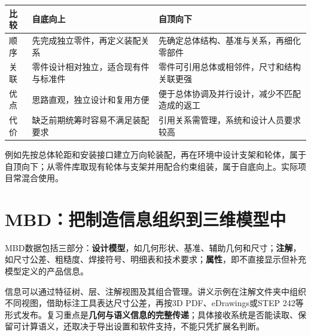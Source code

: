 \begin{center}
\renewcommand{\arraystretch}{1.3}
\begin{tabularx}{\linewidth}{lXX}
\toprule
比较 & 自底向上 & 自顶向下 \\
\midrule
顺序 & 先完成独立零件，再定义装配关系 & 先确定总体结构、基准与关系，再细化零部件 \\
关联 & 零件设计相对独立，适合现有件与标准件 & 零件可引用总体或相邻件，尺寸和结构关联更强 \\
优点 & 思路直观，独立设计和复用方便 & 便于总体协调及并行设计，减少不匹配造成的返工 \\
代价 & 缺乏前期统筹时容易不满足装配要求 & 引用关系需管理，系统和设计人员要求较高 \\
\bottomrule
\end{tabularx}
\end{center}

例如先按总体轮距和安装接口建立万向轮装配，再在环境中设计支架和轮体，属于自顶向下；从零件库取现有轮体与支架并用配合约束组装，属于自底向上。实际项目常混合使用。

\section{MBD：把制造信息组织到三维模型中}

MBD数据包括三部分：\textbf{设计模型}，如几何形状、基准、辅助几何和尺寸；\textbf{注解}，如尺寸公差、粗糙度、焊接符号、明细表和技术要求；\textbf{属性}，即不直接显示但补充模型定义的产品信息。

信息可以通过特征树、层、注解视图及其组合管理。讲义示例在注解文件夹中组织不同视图，借助标注工具表达尺寸公差，再按3D PDF、eDrawings或STEP 242等形式发布。复习重点是\textbf{几何与语义信息的完整传递}；具体接收系统是否能读取、保留可计算语义，还取决于导出设置和软件支持，不能只凭扩展名判断。


\Needspace{9cm}

